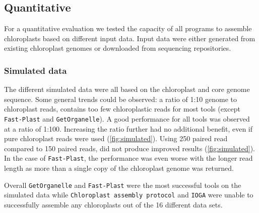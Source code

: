 \documentclass{bmcart}
\newcommand{\formatprogramnames}[1]{\texttt{#1}}
\newcommand{\fp}{\formatprogramnames{Fast-Plast}}
\newcommand{\ioga}{\formatprogramnames{IOGA}}
\newcommand{\np}{\formatprogramnames{NOVOPlasty}}
\newcommand{\go}{\formatprogramnames{GetOrganelle}}
\newcommand{\cassp}{\formatprogramnames{Chloroplast assembly protocol}}
\begin{document}
\subsection*{Quantitative}
For a quantitative evaluation we tested the capacity of all programs to assemble chloroplasts based on different input data.
Input data were either generated from existing chloroplast genomes or downloaded from sequencing repositories. 

\subsubsection*{Simulated data}
The different simulated data were all based on the  chloroplast and core genome sequence.
Some general trends could be observed: a ratio of 1:10 genome to chloroplast reads,  contains too few chloroplastic reads for most tools (except \fp{} and \go{}). A good performance for all tools was observed at a ratio of 1:100.  Increasing the ratio further had no additional benefit, even if pure chloroplast reads were used (\cref{fig:simulated}).
Using \SI{250}{\basepair{}} paired read compared to \SI{150}{\basepair{}} paired reads, did not produce improved results (\cref{fig:simulated}).
In the case of \fp{}, the performance was even worse with the longer read length as more than a single copy of the chloroplast genome was returned.

Overall \go{} and \fp{} were the most successful tools on the simulated data while \cassp{} and \ioga{} were unable to successfully assemble any chloroplasts out of the \num{16} different data sets.
\end{document}
